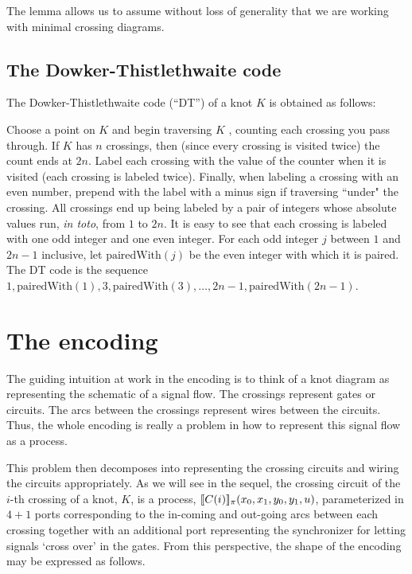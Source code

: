 \documentclass[]{llncs}
\begin{document}


The lemma allows us to assume without loss of generality
that
we are working with minimal crossing diagrams.

\subsection{The Dowker-Thistlethwaite code}

The Dowker-Thistlethwaite code (``DT'') of a knot $K$  is obtained as follows:


Choose a point on $K$ and begin traversing  $K$ , counting each 
 crossing you pass through. If $K$
has $n$  crossings, then (since  every crossing is visited twice) the
count ends at $2n$. Label each crossing with the value of the counter
when it is visited (each crossing is labeled twice).
 Finally, when labeling a crossing with
 an even number,  prepend with the label
with a minus sign if traversing ``under" the crossing.
All crossings end up being labeled by a pair of integers whose absolute values
run, \emph{in toto}, from $1$ to $2n$. It is easy to see that each
 crossing is labeled with 
one odd integer and  one even integer. For each odd integer $j$
 between $1$ and $2n-1$ inclusive, let
 $\textrm{pairedWith}(j)$ be the even integer with which it is paired.
The DT code is 
the sequence $1, \textrm{pairedWith}(1), 3, 
\textrm{pairedWith}(3), \ldots, 2n-1, \textrm{pairedWith}(2n-1)$.

\section{The encoding}

The guiding intuition at work in the encoding is to think of a knot
diagram as representing the schematic of a signal flow. The crossings
represent gates or circuits. The arcs between the crossings represent
wires between the circuits. Thus, the whole encoding is really a
problem in how to represent this signal flow as a process.

This problem then decomposes into representing the crossing circuits
and wiring the circuits appropriately. As we will see in the sequel,
the crossing circuit of the $i$-th crossing of a knot, $K$, is a
process, $[\![ C(i) ]\!]_{\pi}(x_0,x_1,y_0,y_1,u)$, parameterized in $4+1$
ports corresponding to the in-coming and out-going arcs between each
crossing together with an additional port representing the
synchronizer for letting signals `cross over' in the gates. From this
perspective, the shape of the encoding may be expressed as follows.
\end{document}
